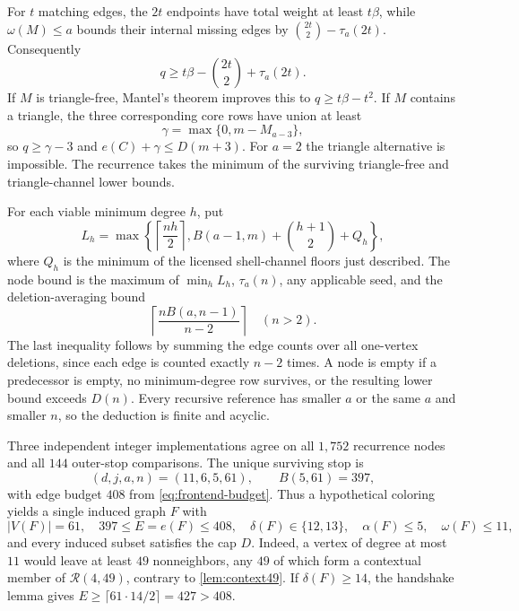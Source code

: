 For $t$ matching edges, the $2t$ endpoints have total weight at least $t\beta$, while $\omega(M)\leq a$ bounds their internal missing edges by $\binom{2t}{2}-\tau_a(2t)$. Consequently
\[
q\geq t\beta-\binom{2t}{2}+\tau_a(2t).
\]
If $M$ is triangle-free, Mantel's theorem \cite{Mantel1907} improves this to $q\geq t\beta-t^2$. If $M$ contains a triangle, the three corresponding core rows have union at least
\[
\gamma=\max\{0,m-M_{a-3}\},
\]
so $q\geq\gamma-3$ and $e(C)+\gamma\leq D(m+3)$. For $a=2$ the triangle alternative is impossible. The recurrence takes the minimum of the surviving triangle-free and triangle-channel lower bounds.

For each viable minimum degree $h$, put
\[
L_h=\max\left\{\left\lceil\frac{nh}{2}\right\rceil,
B(a-1,m)+\binom{h+1}{2}+Q_h\right\},
\]
where $Q_h$ is the minimum of the licensed shell-channel floors just described. The node bound is the maximum of $\min_h L_h$, $\tau_a(n)$, any applicable seed, and the deletion-averaging bound
\[
\left\lceil\frac{nB(a,n-1)}{n-2}\right\rceil\quad(n>2).
\]
The last inequality follows by summing the edge counts over all one-vertex deletions, since each edge is counted exactly $n-2$ times. A node is empty if a predecessor is empty, no minimum-degree row survives, or the resulting lower bound exceeds $D(n)$. Every recursive reference has smaller $a$ or the same $a$ and smaller $n$, so the deduction is finite and acyclic.

Three independent integer implementations agree on all $1,752$ recurrence nodes and all $144$ outer-stop comparisons. The unique surviving stop is
\[
(d,j,a,n)=(11,6,5,61),\qquad B(5,61)=397,
\]
with edge budget $408$ from \eqref{eq:frontend-budget}. Thus a hypothetical coloring yields a single induced graph $F$ with
\begin{equation}
|V(F)|=61,\quad 397\leq E=e(F)\leq408,\quad
\delta(F)\in\{12,13\},\quad
\alpha(F)\leq5,\quad\omega(F)\leq11,
\label{eq:T61-contract}
\end{equation}
and every induced subset satisfies the cap $D$. Indeed, a vertex of degree at most $11$ would leave at least $49$ nonneighbors, any $49$ of which form a contextual member of $\mathcal R(4,49)$, contrary to \cref{lem:context49}. If $\delta(F)\geq14$, the handshake lemma gives $E\geq\lceil61\cdot14/2\rceil=427>408$.
